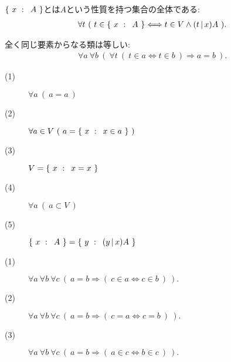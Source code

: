 	
	\begin{screen}
		\begin{axm}[類の公理]
			$\left\{\ x\, \, : \, \, \, A\ \right\}$とは$A$という性質を持つ集合の全体である:
			\begin{align}
				\forall t\ (\ t \in \left\{\ x\, \, : \, \, \, A\ \right\} \Longleftrightarrow t \in V \wedge (t\, |\, x)A\ ).
			\end{align}
		\end{axm}
	\end{screen}
	
	\begin{screen}
		\begin{axm}[外延性の公理]
			全く同じ要素からなる類は等しい:
			\begin{align}
				\forall a\ \forall b\ \left(\ \forall t\ (\ t \in a  \Longleftrightarrow t \in b\ )
				\Longrightarrow a=b\ \right).
			\end{align}
		\end{axm}
	\end{screen}
	
	\begin{screen}
		\begin{thm}\mbox{}
			\begin{description}
				\item[(1)] $\forall a\ (\ a=a\ )$
				\item[(2)] $\forall a \in V\ (\ a = \Set{x}{x \in a}\ )$
				\item[(3)] $V=\left\{\ x\, \, : \, \, \, x=x\ \right\}$
				\item[(4)] $\forall a\ (\ a \subset V\ )$
				\item[(5)] $\left\{\ x\, \, : \, \, \, A\ \right\} = \left\{\ y\, \, : \, \, \, (y\, |\, x)A\ \right\}$
			\end{description}
		\end{thm}
	\end{screen}
	
	\begin{screen}
		\begin{axm}[相等性の公理]\mbox{}
			\begin{description}
				\item[(1)] $\forall a\ \forall b\ \forall c\ \left(\ a=b \Longrightarrow (\ c \in a \Longleftrightarrow c \in b\ )\ \right).$
				\item[(2)] $\forall a\ \forall b\ \forall c\ \left(\ a=b \Longrightarrow (\ c = a \Longleftrightarrow c = b\ )\ \right).$
				\item[(3)] $\forall a\ \forall b\ \forall c\ \left(\ a=b \Longrightarrow (\ a \in c \Longleftrightarrow b \in c\ )\ \right).$
			\end{description}
		\end{axm}
	\end{screen}
	
